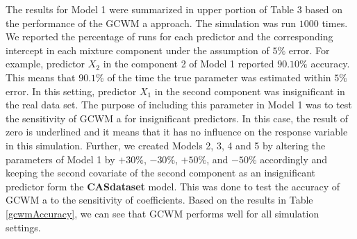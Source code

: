 \documentclass[11pt,letterpaper]{article}
\numberwithin{equation}{section}
\numberwithin{equation}{section}
\numberwithin{equation}{section}
\begin{document}
The results for Model 1 were summarized in upper portion of Table 3 based on the performance of the  GCWM a approach. The simulation was run $1000$ times. We reported the percentage of runs for each predictor and the corresponding intercept in each mixture component under the assumption of $5\%$ error. For example, predictor $X_2$ in the component 2 of Model 1 reported $90.10\%$ accuracy. This means that $90.1\%$ of the time the true parameter was estimated within $5\%$ error. In this setting, predictor $X_1$ in the second component was insignificant in the real data set. The purpose of including this parameter in Model 1 was to test the sensitivity of  GCWM a for insignificant predictors. In this case, the result of zero is underlined and it means that it has no influence on the response variable in this simulation. Further, we created Models 2, 3, 4 and 5 by altering the parameters of Model 1 by $+30\%$, $-30\%$, $+50\%$, and $-50\%$ accordingly and keeping the second covariate of the second component as an insignificant predictor form the \textbf{CASdataset} model. This was done to test the accuracy of  GCWM a to the  sensitivity of coefficients. Based on the results in Table \ref{gcwmAccuracy}, we can see that GCWM performs well for all simulation settings.
\end{document}
